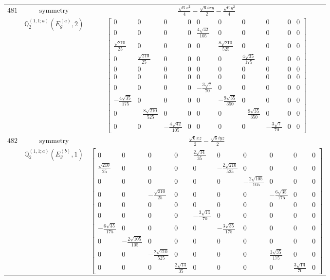 \documentclass[fleqn,8pt,landscape]{jsarticle}
\begin{document}
\begin{longtable}{ccc}
$ 481 $ & $ \text{symmetry} $ & $ \frac{\sqrt{6} x^{2}}{4} - \frac{\sqrt{6} i x y}{2} - \frac{\sqrt{6} y^{2}}{4} $ \\
$  $ & $ \mathbb{Q}_{2}^{(1,1;a)}(E_{g}^{(a)},2) $ & $ \begin{bmatrix} 0 & 0 & 0 & 0 & 0 & 0 & 0 & 0 & 0 & 0 \\ 0 & 0 & 0 & 0 & \frac{4 \sqrt{42}}{105} & 0 & 0 & 0 & 0 & 0 \\ \frac{\sqrt{210}}{25} & 0 & 0 & 0 & 0 & \frac{8 \sqrt{210}}{525} & 0 & 0 & 0 & 0 \\ 0 & \frac{\sqrt{210}}{25} & 0 & 0 & 0 & 0 & \frac{4 \sqrt{35}}{175} & 0 & 0 & 0 \\ 0 & 0 & 0 & 0 & 0 & 0 & 0 & 0 & 0 & 0 \\ 0 & 0 & 0 & 0 & 0 & 0 & 0 & 0 & 0 & 0 \\ 0 & 0 & 0 & 0 & - \frac{3 \sqrt{7}}{70} & 0 & 0 & 0 & 0 & 0 \\ - \frac{4 \sqrt{35}}{175} & 0 & 0 & 0 & 0 & - \frac{9 \sqrt{35}}{350} & 0 & 0 & 0 & 0 \\ 0 & - \frac{8 \sqrt{210}}{525} & 0 & 0 & 0 & 0 & - \frac{9 \sqrt{35}}{350} & 0 & 0 & 0 \\ 0 & 0 & - \frac{4 \sqrt{42}}{105} & 0 & 0 & 0 & 0 & - \frac{3 \sqrt{7}}{70} & 0 & 0 \end{bmatrix} $ \\ \hline
$ 482 $ & $ \text{symmetry} $ & $ \frac{\sqrt{6} x z}{2} - \frac{\sqrt{6} i y z}{2} $ \\
$  $ & $ \mathbb{Q}_{2}^{(1,1;a)}(E_{g}^{(b)},1) $ & $ \begin{bmatrix} 0 & 0 & 0 & 0 & \frac{2 \sqrt{14}}{35} & 0 & 0 & 0 & 0 & 0 \\ \frac{\sqrt{210}}{25} & 0 & 0 & 0 & 0 & - \frac{2 \sqrt{210}}{525} & 0 & 0 & 0 & 0 \\ 0 & 0 & 0 & 0 & 0 & 0 & - \frac{2 \sqrt{105}}{105} & 0 & 0 & 0 \\ 0 & 0 & - \frac{\sqrt{210}}{25} & 0 & 0 & 0 & 0 & - \frac{6 \sqrt{35}}{175} & 0 & 0 \\ 0 & 0 & 0 & 0 & 0 & 0 & 0 & 0 & 0 & 0 \\ 0 & 0 & 0 & 0 & - \frac{3 \sqrt{14}}{70} & 0 & 0 & 0 & 0 & 0 \\ - \frac{6 \sqrt{35}}{175} & 0 & 0 & 0 & 0 & - \frac{3 \sqrt{35}}{175} & 0 & 0 & 0 & 0 \\ 0 & - \frac{2 \sqrt{105}}{105} & 0 & 0 & 0 & 0 & 0 & 0 & 0 & 0 \\ 0 & 0 & - \frac{2 \sqrt{210}}{525} & 0 & 0 & 0 & 0 & \frac{3 \sqrt{35}}{175} & 0 & 0 \\ 0 & 0 & 0 & \frac{2 \sqrt{14}}{35} & 0 & 0 & 0 & 0 & \frac{3 \sqrt{14}}{70} & 0 \end{bmatrix} $ \\ \hline

\end{longtable}
\end{document}
